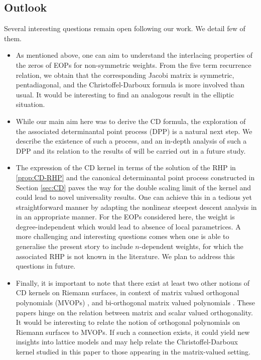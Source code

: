 \documentclass[11pt,a4paper]{article}
\theoremstyle{definition}
\numberwithin{equation}{section}
\numberwithin{theorem}{section}
\begin{document}
\subsection{Outlook}\label{subsec:outloook}
Several interesting questions remain open following our work. We detail few of them.
\begin{itemize}
    \item As mentioned above, one can aim to understand the interlacing properties of the zeros of EOPs for non-symmetric weights. From the five term recurrence relation, we obtain that the corresponding Jacobi matrix is symmetric, pentadiagonal, and the Christoffel-Darboux formula is more involved than usual. It would be interesting to find an analogous result in the elliptic situation.
   
    \item  While our main aim here was to derive the CD formula, the exploration of the associated determinantal point process (DPP) is a natural next step. We describe the existence of such a process, and an in-depth analysis of such a DPP and its relation to the results of \cite{bertola2022critical} will be carried out in a future study. 

  
    \item The expression of the CD kernel in terms of the solution of the RHP in \eqref{prop:CD-RHP} and the canonical determinantal point process constructed in Section \ref{sec:CD} paves the way for the double scaling limit of the  kernel and could lead to novel universality results. One can achieve this in a tedious yet straightforward manner by adapting the nonlinear steepest descent analysis in \cite{bertola2022nonlinear} in an appropriate manner. For the EOPs considered here, the weight is degree-independent which would lead to absence of local parametrices. A more challenging and interesting questions comes when one is able to generalise the present story to include $n$-dependent weights, for which the associated RHP is not known in the literature. We plan to address this questions in future.
    \item Finally, it is important to note that there exist at least two other notions of CD kernels on Riemann surfaces, in context of matrix valued orthogonal polynomials (MVOPs) \cite{charlier2021matrix}, and bi-orthogonal matrix valued polynomials \cite{bertola2023abelianization, charlier2021matrix}. These papers hinge on the relation between matrix and scalar valued orthogonality. It would be interesting to relate the notion of orthogonal polynomials on Riemann surfaces \cite{bertola2022nonlinear, DLR24} to MVOPs. If such a connection exists, it could yield new insights into lattice models \cite{groot2021matrix} and may help relate the Christoffel-Darboux kernel studied in this paper to those appearing in the matrix-valued setting.
    
\end{itemize}%
\end{document}
